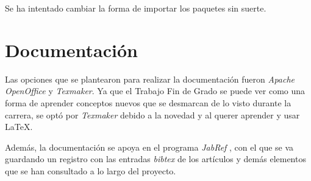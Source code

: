 Se ha intentado cambiar la forma de importar los paquetes sin suerte.

\section{Documentación}\label{documentacion}
Las opciones que se plantearon para realizar la documentación fueron \textit{Apache OpenOffice} y \textit{Texmaker}. Ya que el Trabajo Fin de Grado se puede ver como una forma de aprender conceptos nuevos que se desmarcan de lo visto durante la carrera, se optó por \textit{Texmaker} debido a la novedad y al querer aprender y usar \LaTeX{}.

Además, la documentación se apoya en el programa \textit{JabRef} \cite{jabref}, con el que se va guardando un registro con las entradas \textit{bibtex} de los artículos y demás elementos que se han consultado a lo largo del proyecto.

